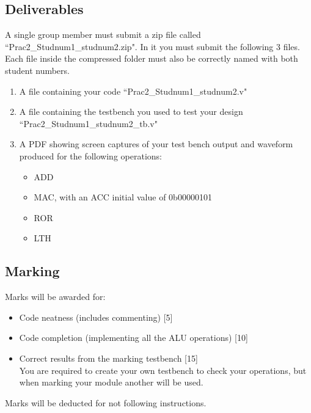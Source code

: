 \subsection{Deliverables}
A single group member must submit a zip file called ``Prac2\_Studnum1\_studnum2.zip". In it you must submit the following 3 files. Each file inside the compressed folder must also be correctly named with both student numbers.

\begin{enumerate}
    \item A file containing your code ``Prac2\_Studnum1\_studnum2.v"
    \item A file containing the testbench you used to test your design ``Prac2\_Studnum1\_studnum2\_tb.v"
    \item A PDF showing screen captures of your test bench output and waveform produced for the following operations:
    \begin{itemize}
        \item ADD
        \item MAC, with an ACC initial value of 0b00000101
        \item ROR
        \item LTH
    \end{itemize}
\end{enumerate}



\subsection{Marking}
Marks will be awarded for:
\begin{itemize}
    \item Code neatness (includes commenting) [5]
    \item Code completion (implementing all the ALU operations) [10]
    \item Correct results from the marking testbench [15]\\
    You are required to create your own testbench to check your operations, but when marking your module another will be used.
\end{itemize}

Marks will be deducted for not following instructions.